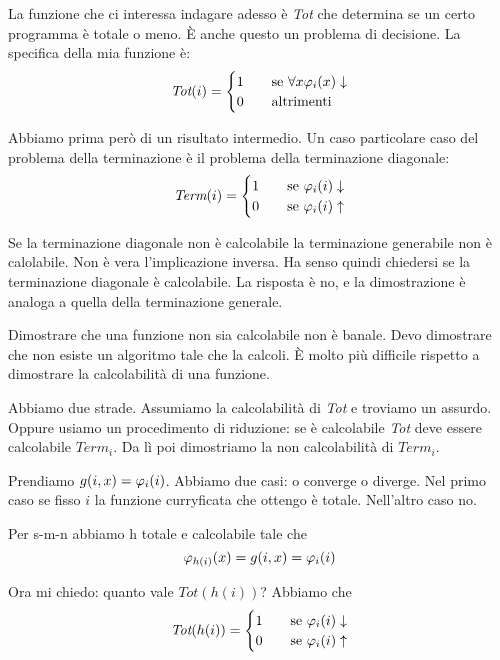 La funzione che ci interessa indagare adesso è \textit{Tot} che determina se un certo programma è
totale o meno. È anche questo un problema di decisione. La specifica della mia funzione è:
\begin{equation*}
    \textit{Tot}(i) =
    \begin{cases}
        1 \quad &\text{se $\forall x \varphi_{i}(x) \downarrow$} \\
        0 \quad &\text{altrimenti}
    \end{cases}
\end{equation*}

Abbiamo prima però di un risultato intermedio. Un caso particolare caso del problema della
terminazione è il problema della terminazione diagonale:
\begin{equation*}
    \textit{Term}(i) =
    \begin{cases}
        1 \quad &\text{se $\varphi_{i}(i) \downarrow$} \\
        0 \quad &\text{se $\varphi_{i}(i) \uparrow$} \\
    \end{cases}
\end{equation*}

Se la terminazione diagonale non è calcolabile la terminazione generabile non è calolabile. Non è
vera l'implicazione inversa. Ha senso quindi chiedersi se la terminazione diagonale è calcolabile.
La risposta è no, e la dimostrazione è analoga a quella della terminazione generale.

Dimostrare che una funzione non sia calcolabile non è banale. Devo dimostrare che non esiste un
algoritmo tale che la calcoli. È molto più difficile rispetto a dimostrare la calcolabilità di una
funzione.

Abbiamo due strade. Assumiamo la calcolabilità di \textit{Tot} e troviamo un assurdo. Oppure usiamo
un procedimento di riduzione: se è calcolabile \textit{Tot} deve essere calcolabile
$\textit{Term}_{i}$. Da lì poi dimostriamo la non calcolabilità di $\textit{Term}_{i}$.

Prendiamo $g(i,x) = \varphi_{i}(i)$. Abbiamo due casi: o converge o diverge. Nel primo caso se fisso $i$
la funzione curryficata che ottengo è totale. Nell'altro caso no.

Per s-m-n abbiamo h totale e calcolabile tale che
\begin{equation*}
    \varphi_{h(i)}(x) = g(i,x) = \varphi_{i}(i)
\end{equation*}

Ora mi chiedo: quanto vale $\textit{Tot}(h(i))$? Abbiamo che
\begin{equation*}
    \textit{Tot}(h(i))=
    \begin{cases}
        1 \quad &\text{se $\varphi_{i}(i) \downarrow$} \\
        0 \quad &\text{se $\varphi_{i}(i) \uparrow$}
    \end{cases}
\end{equation*}

